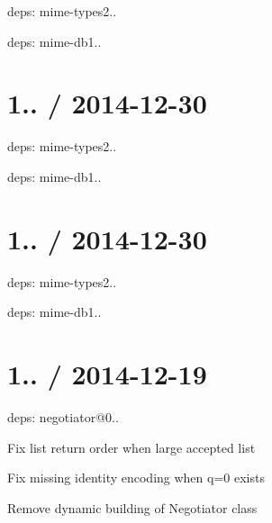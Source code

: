 \begin{DoxyItemize}
\item deps\+: mime-\/types2..
\begin{DoxyItemize}
\item deps\+: mime-\/db1..
\end{DoxyItemize}
\end{DoxyItemize}

\section*{1.. / 2014-\/12-\/30 }


\begin{DoxyItemize}
\item deps\+: mime-\/types2..
\begin{DoxyItemize}
\item deps\+: mime-\/db1..
\end{DoxyItemize}
\end{DoxyItemize}

\section*{1.. / 2014-\/12-\/30 }


\begin{DoxyItemize}
\item deps\+: mime-\/types2..
\begin{DoxyItemize}
\item deps\+: mime-\/db1..
\end{DoxyItemize}
\end{DoxyItemize}

\section*{1.. / 2014-\/12-\/19 }


\begin{DoxyItemize}
\item deps\+: negotiator@0..
\begin{DoxyItemize}
\item Fix list return order when large accepted list
\item Fix missing identity encoding when q=0 exists
\item Remove dynamic building of Negotiator class
\end{DoxyItemize}
\end{DoxyItemize}


